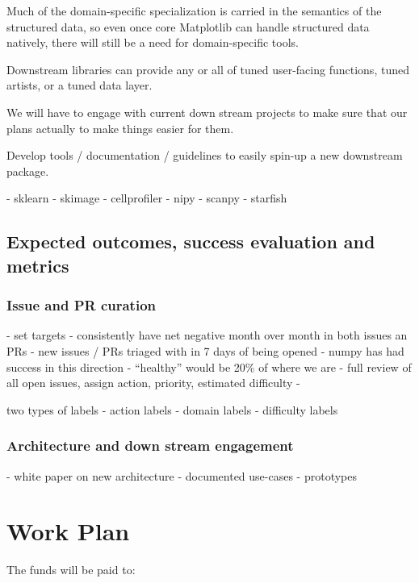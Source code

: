 \documentclass[11pt]{article}  %
\begin{document}
Much of the domain-specific specialization is carried in the semantics
of the structured data, so even once core Matplotlib can handle structured
data natively, there will still be a need for domain-specific tools.

Downstream libraries can provide any or all of tuned user-facing
functions, tuned artists, or a tuned data layer.

We will have to engage with current down stream projects to make sure
that our plans actually to make things easier for them.

Develop tools / documentation / guidelines to easily spin-up a new
downstream package.

- sklearn
- skimage
- cellprofiler
- nipy
- scanpy
- starfish


\subsection{Expected outcomes, success evaluation and metrics}
\subsubsection{Issue and PR curation}
- set targets
 - consistently have net negative month over month in both issues an PRs
 - new issues / PRs triaged with in 7 days of being opened
 - numpy has had success in this direction
 - ``healthy'' would be 20\% of where we are
 - full review of all open issues, assign action, priority, estimated difficulty
 -

 two types of labels
 - action labels
 - domain labels
 - difficulty labels

\subsubsection{Architecture and down stream engagement}
- white paper on new architecture
- documented use-cases
- prototypes



\section{Work Plan}

The funds will be paid to:
\end{document}
